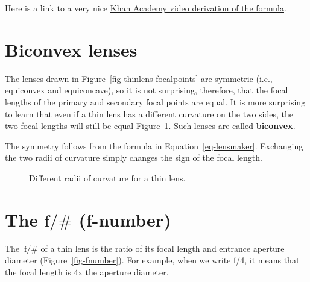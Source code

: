 \documentclass[
  letterpaper,
]{book}
\begin{document}
Here is a link to a very nice
\href{https://www.khanacademy.org/science/in-in-class-12th-physics-india/in-in-ray-optics-and-optical-instruments/in-in-refraction-in-thin-lenses/v/lens-makers-formula}{Khan
Academy video derivation of the formula}.

\section{Biconvex lenses}\label{sec-optics-biconvex}

The lenses drawn in Figure~\ref{fig-thinlens-focalpoints} are symmetric
(i.e., equiconvex and equiconcave), so it is not surprising, therefore,
that the focal lengths of the primary and secondary focal points are
equal. It is more surprising to learn that even if a thin lens has a
different curvature on the two sides, the two focal lengths will still
be equal Figure~\ref{fig-thinlens-asymmetric}. Such lenses are called
\textbf{biconvex}.

The symmetry follows from the formula in Equation~\ref{eq-lensmaker}.
Exchanging the two radii of curvature simply changes the sign of the
focal length.

\begin{figure}


\caption{\label{fig-thinlens-asymmetric}Different radii of curvature for
a thin lens.}

\end{figure}%

\section{\texorpdfstring{The \(\mathrm{f}/\#\)
(f-number)}{The \textbackslash mathrm\{f\}/\textbackslash\# (f-number)}}\label{sec-optics-fnumber}

The \(~\mathrm{f}/\#\) of a thin lens is the ratio of its focal length
and entrance aperture diameter (Figure~\ref{fig-fnumber}). For example,
when we write f/4, it means that the focal length is 4x the aperture
diameter.
\end{document}
